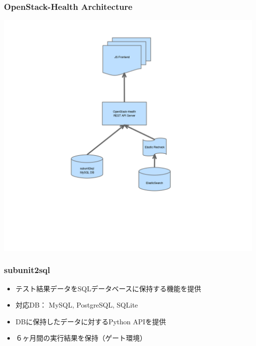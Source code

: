 \documentclass[aspectratio=169,11pt,hyperref={colorlinks=true}]{beamer}
\begin{document}
\begin{frame}
  \frametitle{OpenStack-Health Architecture}
  \begin{center}
    \includegraphics[height=1.2\textheight]{openstack-health-arch.png}
  \end{center}
\end{frame}

\begin{frame}
  \frametitle{subunit2sql}
  \begin{itemize}
    \item テスト結果データをSQLデータベースに保持する機能を提供
    \item 対応DB： MySQL, PostgreSQL, SQLite
    \item DBに保持したデータに対するPython APIを提供
    \item ６ヶ月間の実行結果を保持（ゲート環境）
  \end{itemize}
\end{frame}
\end{document}
